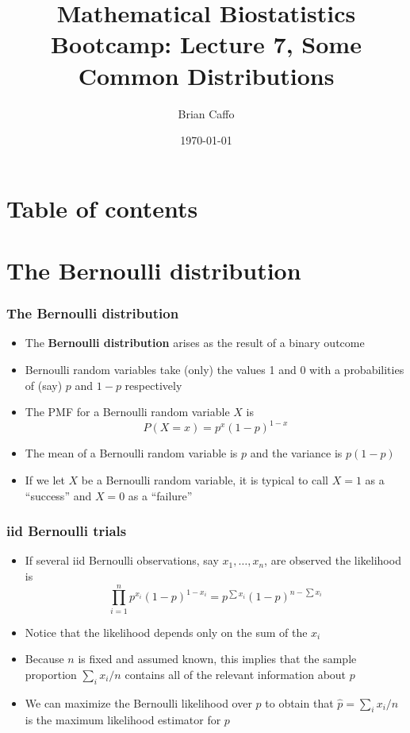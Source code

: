\documentclass[aspectratio=169]{beamer}
\title{Mathematical Biostatistics Bootcamp: Lecture 7, Some Common Distributions}
\author{Brian Caffo}
\date{\today}
\institute[Department of Biostatistics]{
  Department of Biostatistics \\
  Johns Hopkins Bloomberg School of Public Health\\
  Johns Hopkins University
}
\begin{document}
\frame{\titlepage}


\section{Table of contents}


\section{The Bernoulli distribution}
\begin{frame}\frametitle{The Bernoulli distribution}
\begin{itemize}
\item The {\bf Bernoulli distribution} arises as the result of a
  binary outcome
\item Bernoulli random variables take (only) the values 1 and 0 with a
  probabilities of (say) $p$ and $1-p$ respectively
\item The PMF for a Bernoulli random variable $X$ is
  $$P(X = x) =  p^x (1 - p)^{1 - x}$$
\item The mean of a Bernoulli random variable is $p$ and the variance
  is $p(1 - p)$
\item If we let $X$ be a Bernoulli random variable, it is typical to
  call $X=1$ as a ``success'' and $X=0$ as a ``failure''
\end{itemize}
\end{frame}


\begin{frame}\frametitle{iid Bernoulli trials}
\begin{itemize}
\item If several iid Bernoulli observations, say $x_1,\ldots, x_n$, are observed the
likelihood is 
$$
  \prod_{i=1}^n p^{x_i} (1 - p)^{1 - x_i} = p^{\sum x_i} (1 - p)^{n - \sum x_i}
$$
\item Notice that the likelihood depends only on the sum of the $x_i$
\item Because $n$ is fixed and assumed known, this implies that the
  sample proportion $\sum_i x_i / n$ contains all of the relevant
  information about $p$
\item We can maximize the Bernoulli likelihood over $p$ to obtain that
$\hat p = \sum_i x_i / n$ is the maximum likelihood estimator for $p$
\end{itemize}
\end{frame}
\end{document}
